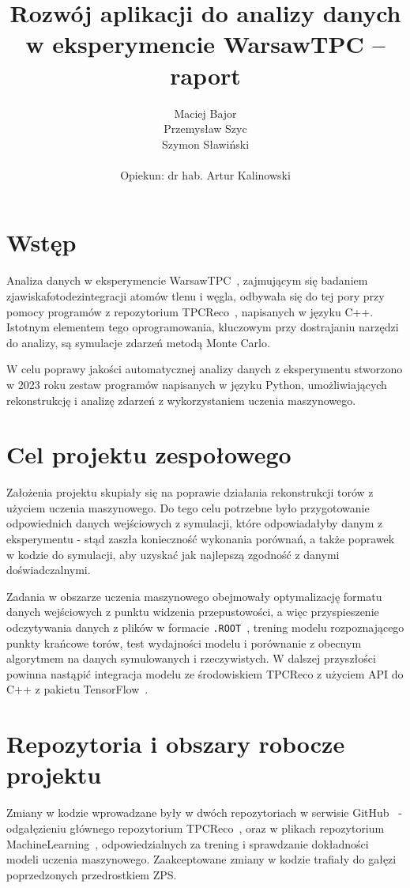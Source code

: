 \documentclass{article}
\title{Rozwój aplikacji do analizy danych w eksperymencie WarsawTPC -- raport}
\author{Maciej Bajor \\ Przemysław Szyc \\ Szymon Sławiński \\\\ Opiekun: dr hab. Artur Kalinowski}
\begin{document}
\maketitle

\section{Wstęp}
Analiza danych w eksperymencie WarsawTPC~\cite{WAWTPC}, zajmującym się badaniem zjawiska\linebreak fotodezintegracji atomów tlenu i węgla, odbywała się do tej pory przy pomocy programów z repozytorium TPCReco~\cite{TPCReco}, napisanych w języku C++. Istotnym elementem tego oprogramowania, kluczowym przy dostrajaniu narzędzi do analizy, są symulacje zdarzeń metodą Monte Carlo.

W celu poprawy jakości automatycznej analizy danych z eksperymentu stworzono w 2023 roku zestaw programów napisanych w języku Python, umożliwiających rekonstrukcję i analizę zdarzeń z wykorzystaniem uczenia maszynowego.

\section{Cel projektu zespołowego}
Założenia projektu skupiały się na poprawie działania rekonstrukcji torów z użyciem uczenia maszynowego. Do tego celu potrzebne było przygotowanie odpowiednich danych wejściowych z symulacji, które odpowiadałyby danym z eksperymentu - stąd zaszła konieczność wykonania porównań, a także poprawek w kodzie do symulacji, aby uzyskać jak najlepszą zgodność z danymi doświadczalnymi.

Zadania w obszarze uczenia maszynowego obejmowały optymalizację formatu danych wejściowych z punktu widzenia przepustowości, a więc przyspieszenie odczytywania danych z plików w formacie \texttt{.ROOT}~\cite{root}, trening modelu rozpoznającego punkty krańcowe torów, test wydajności modelu i porównanie z obecnym algorytmem na danych symulowanych i rzeczywistych. W dalszej przyszłości powinna nastąpić integracja modelu ze środowiskiem TPCReco z użyciem API do C++  z pakietu TensorFlow~\cite{TensorFlow}.
\section{Repozytoria i obszary robocze projektu}
Zmiany w kodzie wprowadzane były w dwóch repozytoriach w serwisie GitHub~\cite{GitHub} - odgałęzieniu głównego repozytorium TPCReco~\cite{TPCRecofork}, oraz w plikach repozytorium MachineLearning~\cite{WAWTPCfork}, odpowiedzialnych za trening i sprawdzanie dokładności modeli uczenia maszynowego. Zaakceptowane zmiany w kodzie trafiały do gałęzi poprzedzonych przedrostkiem ZPS.
\end{document}

